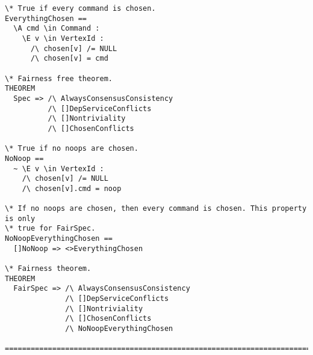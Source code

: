 \begin{verbatim}
\* True if every command is chosen.
EverythingChosen ==
  \A cmd \in Command :
    \E v \in VertexId :
      /\ chosen[v] /= NULL
      /\ chosen[v] = cmd

\* Fairness free theorem.
THEOREM
  Spec => /\ AlwaysConsensusConsistency
          /\ []DepServiceConflicts
          /\ []Nontriviality
          /\ []ChosenConflicts

\* True if no noops are chosen.
NoNoop ==
  ~ \E v \in VertexId :
    /\ chosen[v] /= NULL
    /\ chosen[v].cmd = noop

\* If no noops are chosen, then every command is chosen. This property is only
\* true for FairSpec.
NoNoopEverythingChosen ==
  []NoNoop => <>EverythingChosen

\* Fairness theorem.
THEOREM
  FairSpec => /\ AlwaysConsensusConsistency
              /\ []DepServiceConflicts
              /\ []Nontriviality
              /\ []ChosenConflicts
              /\ NoNoopEverythingChosen

================================================================================
\end{verbatim}
